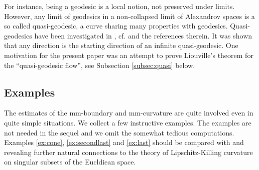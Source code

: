 \documentclass[12pt,leqno]{amsart}
\numberwithin{equation}{section}
\theoremstyle{definition}
\theoremstyle{remark}
\begin{document}
For instance,  being a geodesic is a local notion, not preserved under limits.  However, any limit of geodesics  in  a non-collapsed
limit  of Alexandrov spaces  is a so called quasi-geodesic, a  curve sharing many properties with geodesics.  Quasi-geodesics have been investigated  in \cite{PP}, cf. \cite{Petsemi} and the references therein. It was shown that any direction is the starting direction of an infinite quasi-geodesic.
One motivation for the present paper was an attempt to prove Liouville's theorem for the ``quasi-geodesic flow'', see Subsection
\ref{subsec:quasi} below.





\subsection{Examples} \label{subsec:example}
The estimates of the   mm-boundary and mm-curvature are quite involved even in  quite  simple situations.
We collect a few instructive examples. %
The examples  are not  needed in the sequel and we omit the somewhat tedious computations.   Examples \ref{ex:cone}, \ref{ex:secondlast} and \ref{ex:last} should be compared with
\cite{Bernig-CAT} and \cite{Bernig-Alex} revealing further natural connections to the theory of Lipschitz-Killing curvature on singular subsets of the Eucldiean space.
\end{document}
